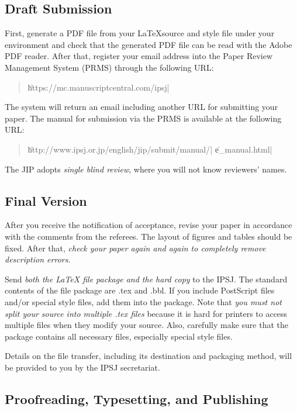 \documentclass[english,preprint,JIP]{ipsj}
\begin{document}


\subsection{Draft Submission}

First, generate a PDF file from your \LaTeX source and style file under
your {\LaTeXe} environment and check that the generated PDF file can be
read with the Adobe PDF reader.  After that, register your email address
into the Paper Review Management System (PRMS) through the following
URL:
\begin{quote}
 \small
 \|https://mc.manuscriptcentral.com/ipsj|
\end{quote}

\noindent
The system will return an email including another URL for submitting
your paper. The manual for submission via the PRMS is available at the
following URL: 
\begin{quote}
 \small
 \|http://www.ipsj.or.jp/english/jip/submit/manual/|
 \|e_manual.html|
\end{quote}

The JIP adopts \textit{single blind review}, 
where you will not know reviewers' names.


\subsection{Final Version}

After you receive the notification of acceptance, revise your paper in
accordance with the comments from the referees.
The layout of
figures and tables should be fixed. After that, \textit{check your paper
again and again to completely remove description errors}.

Send \textit{both the {\LaTeX} file package and the hard copy} to the
IPSJ\@. The standard contents of the file package are .tex and .bbl. If
you include PostScript files and/or special style files, add them into
the package. Note that \textit{you must not split your source into
multiple .tex files} because it is hard for printers to access multiple
files when they modify your source. Also, carefully make sure that the
package contains all necessary files, especially special style files.

Details on the file transfer, including its destination and packaging
method, will be provided to you by the IPSJ secretariat.

\subsection{Proofreading, Typesetting, and Publishing}
\end{document}
